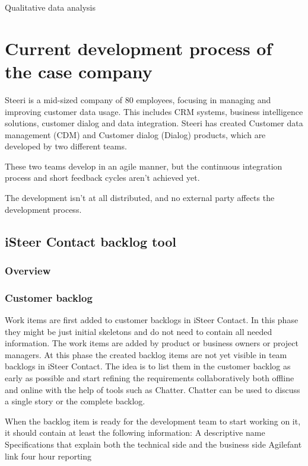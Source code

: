 \documentclass[english]{tktltiki2}
\theoremstyle{definition}
\theoremstyle{remark}
\begin{document}
Qualitative data analysis \cite{robson2002real} \

\section{Current development process of the case company}	
Steeri is a mid-sized company of 80 employees, focusing in managing and improving customer data usage. This includes CRM systems, business intelligence solutions, customer dialog and data integration. Steeri has created Customer data management (CDM) and Customer dialog (Dialog) products, which are developed by two different teams. 

These two teams develop in an agile manner, but the continuous integration process \cite{fowler2006continuous} and short feedback cycles aren't achieved yet. 

The development isn't at all distributed, and no external party affects the development process. 

\subsection{iSteer Contact backlog tool}

\subsubsection{Overview}

\subsubsection{Customer backlog}
Work items are first added to customer backlogs in iSteer Contact. In this phase they might be just initial skeletons and do not need to contain all needed information. The work items are added by product or business owners or project managers. At this phase the created backlog items are not yet visible in team backlogs in iSteer Contact. The idea is to list them in the customer backlog as early as possible and start refining the requirements collaboratively both offline and online with the help of tools such as Chatter. Chatter can be used to discuss a single story or the complete backlog.

When the backlog item is ready for the development team to start working on it, it should contain at least the following information:
A descriptive name
Specifications that explain both the technical side and the business side
Agilefant link four hour reporting
\end{document}
